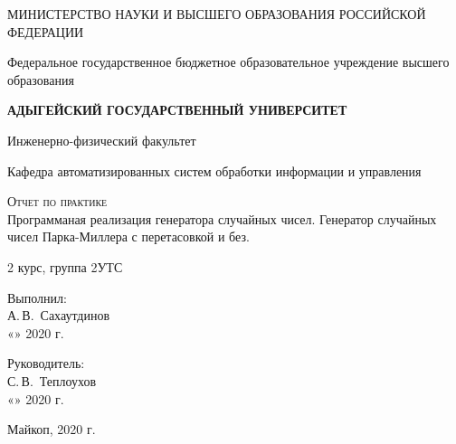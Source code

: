 \documentclass[12pt,a4paper]{scrartcl}
\begin{document}
	\begin{titlepage}
		\begin{center}
			\large
			МИНИСТЕРСТВО НАУКИ И ВЫСШЕГО ОБРАЗОВАНИЯ РОССИЙСКОЙ ФЕДЕРАЦИИ
			
			Федеральное государственное бюджетное образовательное учреждение высшего образования
			
			\textbf{АДЫГЕЙСКИЙ ГОСУДАРСТВЕННЫЙ УНИВЕРСИТЕТ}
			\vspace{0.25cm}
			
			Инженерно-физический факультет
			
			Кафедра автоматизированных систем обработки информации и управления
			\vfill

			\vfill
			
			\textsc{Отчет по практике}\\[5mm]
			
			{\LARGE Программаная реализация генератора случайных чисел. \LARGE{ Генератор случайных чисел Парка-Миллера с перетасовкой и без.}}
			\bigskip
   
			2 курс, группа 2УТС
		\end{center}
		\vfill
		
		\newlength{\ML}
		\hfill\begin{minipage}{0.5\textwidth}
			Выполнил:\\
			\underline{\hspace{\ML}} А.\,В.~Сахаутдинов\\
			«\underline{\hspace{0.7cm}}» \underline{\hspace{2cm}} 2020 г.
		\end{minipage}%
		\bigskip
		
		\hfill\begin{minipage}{0.5\textwidth}
			Руководитель:\\
			\underline{\hspace{\ML}} С.\,В.~Теплоухов\\
			«\underline{\hspace{0.7cm}}» \underline{\hspace{2cm}} 2020 г.
		\end{minipage}%
		\vfill
		
		\begin{center}
			Майкоп, 2020 г.
		\end{center}
	\end{titlepage}
	
\end{document}
